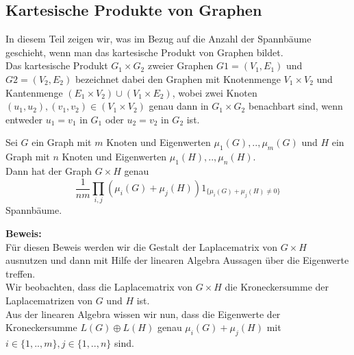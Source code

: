 \subsection{Kartesische Produkte von Graphen}
In diesem Teil zeigen wir, was im Bezug auf die Anzahl der Spannbäume geschieht, wenn man das kartesische Produkt von Graphen bildet.\\
Das kartesische Produkt $G_1\times G_2$ zweier Graphen $G1=(V_1,E_1)$ und $G2=(V_2,E_2)$ bezeichnet dabei den Graphen mit Knotenmenge $V_1\times V_2$ und Kantenmenge $(E_1\times V_2)\cup(V_1\times E_2)$, wobei zwei Knoten $(u_1,u_2), (v_1,v_2) \in (V_1\times V_2)$ genau dann in $G_1\times G_2$ benachbart sind, wenn entweder $u_1=v_1$ in $G_1$ oder $u_2=v_2$ in $G_2$ ist.\\
\begin{Tms}
 Sei $G$ ein Graph mit $m$ Knoten und Eigenwerten $\mu_1(G),..,\mu_m(G)$ und $H$ ein Graph mit $n$ Knoten und Eigenwerten $\mu_1(H),..,\mu_n(H)$. \\
Dann hat der Graph $G \times H$ genau
\begin{equation}
\frac{1}{nm}\displaystyle\prod_{i,j}(\mu_i(G)+\mu_j(H))1_{\{\mu_i(G)+\mu_j(H)\neq0\}}
\end{equation}
Spannbäume.
\label{tmcpG}
\end{Tms}
\textbf{Beweis:}\\
Für diesen Beweis werden wir die Gestalt der Laplacematrix von $G \times H$ ausnutzen und dann mit Hilfe der linearen Algebra Aussagen über die Eigenwerte treffen.\\
Wir beobachten, dass die Laplacematrix von $G\times H$ die Kroneckersumme der Laplacematrizen von $G$ und $H$ ist.\\
Aus der linearen Algebra wissen wir nun, dass die Eigenwerte der Kroneckersumme $L(G) \oplus L(H)$ genau $\mu_i(G)+\mu_j(H)$ mit $i \in \{ 1,..,m\}, j \in \{ 1,..,n\}$ sind.\\
